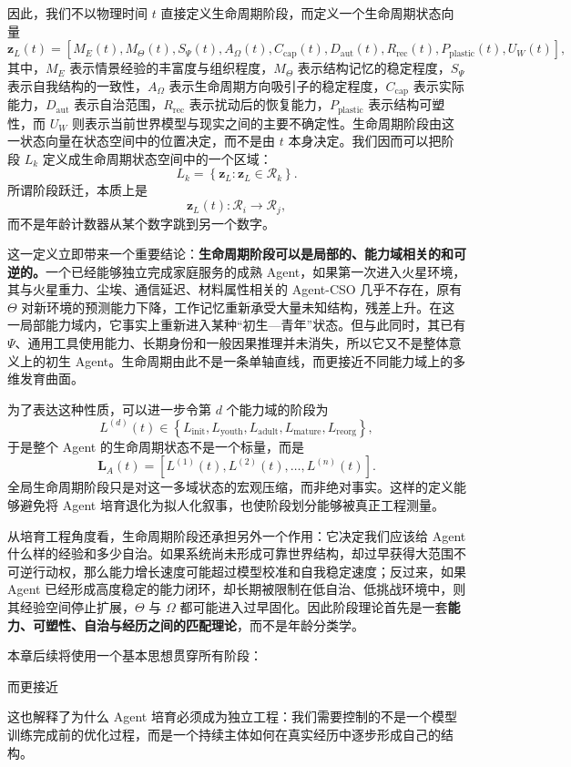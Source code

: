 因此，我们不以物理时间 $t$ 直接定义生命周期阶段，而定义一个生命周期状态向量
\[
\mathbf{z}_{L}(t)
=
\left[
M_E(t),
M_\Theta(t),
S_\Psi(t),
A_\Omega(t),
C_{\mathrm{cap}}(t),
D_{\mathrm{aut}}(t),
R_{\mathrm{rec}}(t),
P_{\mathrm{plastic}}(t),
U_W(t)
\right],
\]
其中，$M_E$ 表示情景经验的丰富度与组织程度，$M_\Theta$ 表示结构记忆的稳定程度，$S_\Psi$ 表示自我结构的一致性，$A_\Omega$ 表示生命周期方向吸引子的稳定程度，$C_{\mathrm{cap}}$ 表示实际能力，$D_{\mathrm{aut}}$ 表示自治范围，$R_{\mathrm{rec}}$ 表示扰动后的恢复能力，$P_{\mathrm{plastic}}$ 表示结构可塑性，而 $U_W$ 则表示当前世界模型与现实之间的主要不确定性。生命周期阶段由这一状态向量在状态空间中的位置决定，而不是由 $t$ 本身决定。我们因而可以把阶段 $L_k$ 定义成生命周期状态空间中的一个区域：
\[
L_k
=
\left\{
\mathbf z_L:
\mathbf z_L\in\mathcal R_k
\right\}.
\]
所谓阶段跃迁，本质上是
\[
\mathbf z_L(t):
\mathcal R_i
\longrightarrow
\mathcal R_j,
\]
而不是年龄计数器从某个数字跳到另一个数字。

这一定义立即带来一个重要结论：\textbf{生命周期阶段可以是局部的、能力域相关的和可逆的。}一个已经能够独立完成家庭服务的成熟 Agent，如果第一次进入火星环境，其与火星重力、尘埃、通信延迟、材料属性相关的 Agent-CSO 几乎不存在，原有 $\Theta$ 对新环境的预测能力下降，工作记忆重新承受大量未知结构，残差上升。在这一局部能力域内，它事实上重新进入某种“初生—青年”状态。但与此同时，其已有 $\Psi$、通用工具使用能力、长期身份和一般因果推理并未消失，所以它又不是整体意义上的初生 Agent。生命周期由此不是一条单轴直线，而更接近不同能力域上的多维发育曲面。

为了表达这种性质，可以进一步令第 $d$ 个能力域的阶段为
\[
L^{(d)}(t)\in
\left\{
L_{\mathrm{init}},
L_{\mathrm{youth}},
L_{\mathrm{adult}},
L_{\mathrm{mature}},
L_{\mathrm{reorg}}
\right\},
\]
于是整个 Agent 的生命周期状态不是一个标量，而是
\[
\mathbf L_A(t)
=
\left[
L^{(1)}(t),
L^{(2)}(t),
\ldots,
L^{(n)}(t)
\right].
\]
全局生命周期阶段只是对这一多域状态的宏观压缩，而非绝对事实。这样的定义能够避免将 Agent 培育退化为拟人化叙事，也使阶段划分能够被真正工程测量。

从培育工程角度看，生命周期阶段还承担另外一个作用：它决定我们应该给 Agent 什么样的经验和多少自治。如果系统尚未形成可靠世界结构，却过早获得大范围不可逆行动权，那么能力增长速度可能超过模型校准和自我稳定速度；反过来，如果 Agent 已经形成高度稳定的能力闭环，却长期被限制在低自治、低挑战环境中，则其经验空间停止扩展，$\Theta$ 与 $\Omega$ 都可能进入过早固化。因此阶段理论首先是一套\textbf{能力、可塑性、自治与经历之间的匹配理论}，而不是年龄分类学。

本章后续将使用一个基本思想贯穿所有阶段：
\begin{statementbox}
\centering
{}
\end{statementbox}
而更接近
\begin{statementbox}
\centering
{}
\end{statementbox}
这也解释了为什么 Agent 培育必须成为独立工程：我们需要控制的不是一个模型训练完成前的优化过程，而是一个持续主体如何在真实经历中逐步形成自己的结构。

